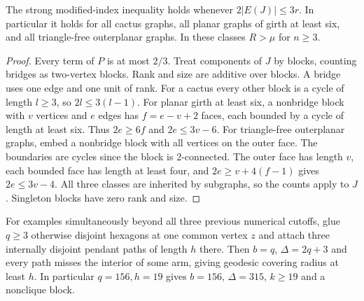 \documentclass[11pt,a4paper]{article}
\begin{document}
\begin{corollary}
The strong modified-index inequality holds whenever
$2|E(J)|\le3r$. In particular it holds for all cactus graphs, all
planar graphs of girth at least six, and all triangle-free outerplanar
graphs. In these classes $R>\mu$ for $n\ge3$.
\end{corollary}
\begin{proof}
Every term of $P$ is at most $2/3$. Treat components of $J$ by blocks,
counting bridges as two-vertex blocks. Rank and size are additive over
blocks. A bridge uses one edge and one unit of rank. For a cactus
every other block is a cycle of length $l\ge3$, so
$2l\le3(l-1)$. For planar girth at least six, a nonbridge block with
$v$ vertices and $e$ edges has $f=e-v+2$ faces, each bounded by a
cycle of length at least six. Thus $2e\ge6f$ and $2e\le3v-6$.
For triangle-free outerplanar graphs, embed a nonbridge block with all
vertices on the outer face. The boundaries are cycles since the block
is 2-connected. The outer face has length $v$, each bounded face has
length at least four, and $2e\ge v+4(f-1)$ gives $2e\le3v-4$.
All three classes are inherited by subgraphs, so the counts apply to
$J$. Singleton blocks have zero rank and size.
\end{proof}
For examples simultaneously beyond all three previous numerical cutoffs,
glue $q\ge3$ otherwise disjoint hexagons at one common vertex $z$
and attach three internally disjoint pendant paths of length $h$ there.
Then $b=q$, $\Delta=2q+3$ and every path misses the interior of some
arm, giving geodesic covering radius at least $h$. In particular
$q=156,h=19$ gives $b=156$, $\Delta=315$, $k\ge19$ and a nonclique
block.
\end{document}
